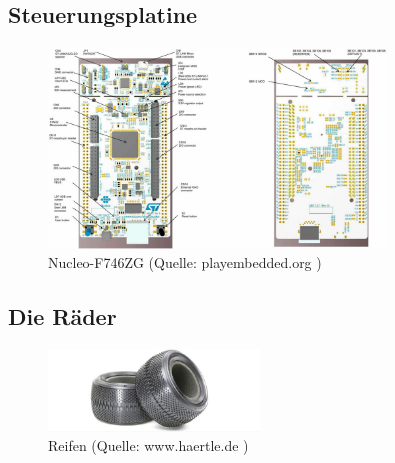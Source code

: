 \subsection{Steuerungsplatine}
\begin{figure}[!h]  %
	\centering\includegraphics[width=0.8\textwidth]{images/Nucleo.jpg}
	\caption{Nucleo-F746ZG  \newline (Quelle: playembedded.org )}
	\label{Nucleo} %
\end{figure}



\subsection{Die Räder}

\begin{figure}[!h]  %
	\centering\includegraphics[width=0.5\textwidth]{images/reifen.png}
	\caption{Reifen \newline (Quelle: www.haertle.de )}
	\label{reifen} %
\end{figure}

